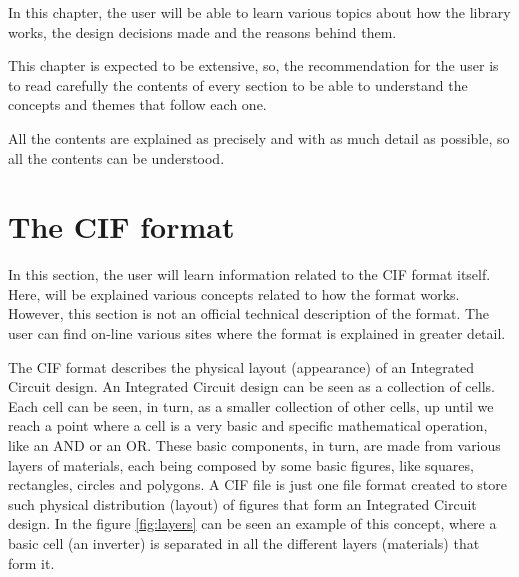 \documentclass[11pt,twoside,openany,x11names,svgnames]{memoir}
\begin{document}
In this chapter, the user will be able to learn various topics about how the library works, the design decisions made and the reasons behind them.

This chapter is expected to be extensive, so, the recommendation for the user is to read carefully the contents of every section to be able to understand the concepts and themes that follow each one.

All the contents are explained as precisely and with as much detail as possible, so all the contents can be understood.
\newpage 

\section{The CIF format}\label{The-CIF-format}

In this section, the user will learn information related to the CIF format itself. Here, will be explained various concepts related to how the format works. However, this section is not an official technical description of the format. The user can find on-line various sites where the format is explained in greater detail.

The CIF format describes the physical layout (appearance) of an Integrated Circuit design. An Integrated Circuit design can be seen as a collection of cells. Each cell can be seen, in turn, as a smaller collection of other cells, up until we reach a point where a cell is a very basic and specific mathematical operation, like an AND or an OR. These basic components, in turn, are made from various layers of materials, each being composed by some basic figures, like squares, rectangles, circles and polygons. A CIF file is just one file format created to store such physical distribution (layout) of figures that form an Integrated Circuit design. In the figure \ref{fig:layers} can be seen an example of this concept, where a basic cell (an inverter) is separated in all the different layers (materials) that form it.
\end{document}
